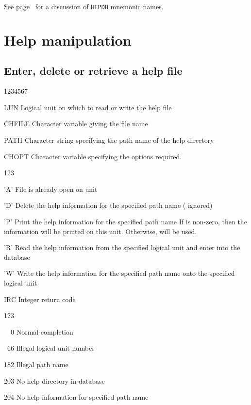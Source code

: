 See page~\pageref{HDB-MNEMONIC} for a discussion of {\tt HEPDB} mnemonic names.

\section{Help manipulation}

\subsection{Enter, delete or retrieve a help file}


\begin{DLtt}{1234567}
\item[LUN]Logical unit on which to read or write the
  help file
\item[CHFILE]Character variable giving the file name
\item[PATH]Character string specifying the path name
  of the help directory
\item[CHOPT]Character variable specifying the options required.
  \begin{DLtt}{123}
    \item['A']File is already open on unit 
    \item['D']Delete the help information for the specified path name
    ( ignored)
    \item['P']Print the help information for the specified path name
    If  is non-zero, then the information will be printed on this
    unit. Otherwise,  will be used.
    \item['R']Read the help information from the specified logical
    unit and enter into the database
    \item['W']Write the help information for the specified path name
    onto the specified logical unit
  \end{DLtt}
\item[IRC]Integer return code
  \begin{DLtt}{123}
    \item[\ \ 0]Normal completion
    \item[\ 66]Illegal logical unit number
    \item[182]Illegal path name
    \item[203]No help directory in database
    \item[204]No help information for specified path name
  \end{DLtt}
\end{DLtt}


